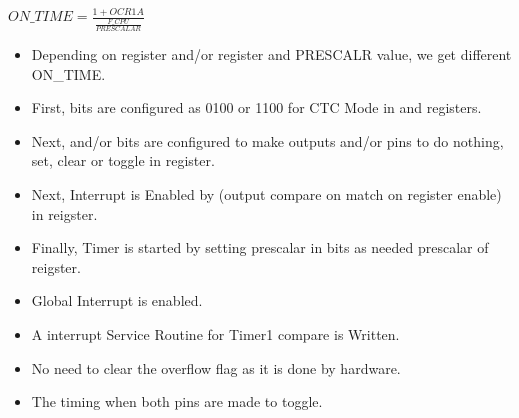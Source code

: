 \documentclass{article}
\begin{document}
\begin{center}
    $ON\_TIME = \frac{1 + OCR1A}{\frac{F\_CPU}{PRESCALAR}}$
\end{center}
\begin{itemize}
    \item Depending on  register and/or  register and PRESCALR value, we get different ON\_TIME.
    \item First,  bits are configured as 0100 or 1100 for CTC Mode in  and  registers.
    \item Next,  and/or  bits are configured to make outputs  and/or  pins to do nothing, set, clear or toggle in  register.
    \item Next, Interrupt is Enabled by  (output compare on match on  register enable) in  reigster.
    \item Finally, Timer is started by setting prescalar in  bits as needed prescalar of  reigster.
    \item Global Interrupt is enabled.
    \item A interrupt Service Routine for Timer1 compare is Written.
    \item No need to clear the overflow flag as it is done by hardware.
    \item The timing when both pins  are made to toggle.
\end{itemize}
\end{document}
